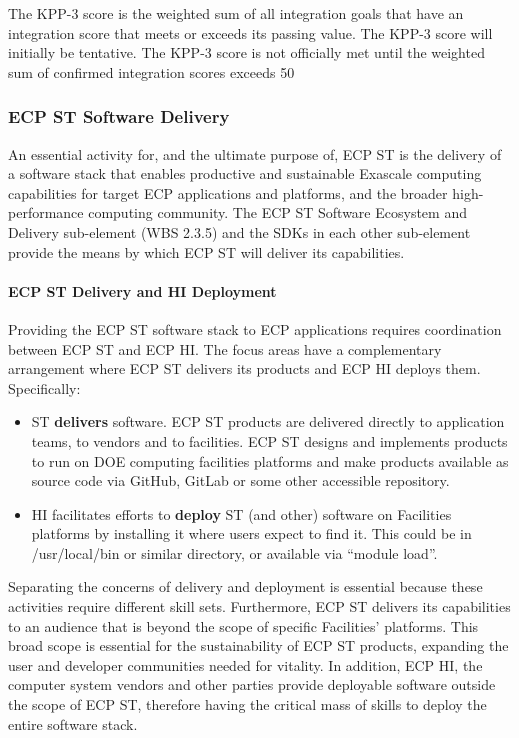 The KPP-3 score is the weighted sum of all integration goals that have an integration score that meets or exceeds its passing value. 
The KPP-3 score will initially be tentative.  The KPP-3 score is not officially met until the weighted sum of confirmed integration scores exceeds 50%


\subsubsection{ECP ST Software Delivery}
An essential activity for, and the ultimate purpose of, ECP ST is the delivery of a software stack that enables productive and sustainable Exascale computing capabilities for target ECP applications and platforms, and the broader high-performance computing community. The ECP ST Software Ecosystem and Delivery sub-element (WBS 2.3.5) and the SDKs in each other sub-element provide the means by which ECP ST will deliver its capabilities.
\paragraph{ECP ST Delivery and HI Deployment}
Providing the ECP ST software stack to ECP applications requires coordination between ECP ST and ECP HI. The focus areas have a complementary arrangement where ECP ST delivers its products and ECP HI deploys them. Specifically:
\begin{itemize}
	\item ST \textbf{delivers} software.  ECP ST products are delivered directly to application teams, to vendors and to facilities.  ECP ST designs and implements products to run on DOE computing facilities platforms and make products available as source code via GitHub, GitLab or some other accessible repository.
	\item HI facilitates efforts to \textbf{deploy} ST (and other) software on Facilities platforms by installing it where users expect to find it. This could be in /usr/local/bin or similar directory, or available via “module load”.
\end{itemize}
Separating the concerns of delivery and deployment is essential because these activities require different skill sets. Furthermore, ECP ST delivers its capabilities to an audience that is beyond the scope of specific Facilities’ platforms. This broad scope is essential for the sustainability of ECP ST products, expanding the user and developer communities needed for vitality. In addition, ECP HI, the computer system vendors and other parties provide deployable software outside the scope of ECP ST, therefore having the critical mass of skills to deploy the entire software stack.

